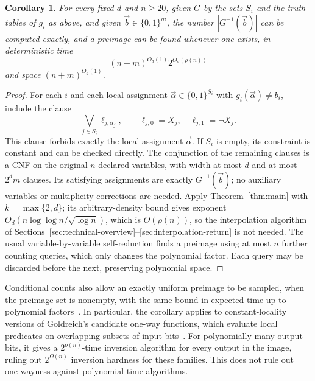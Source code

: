 \documentclass[11pt,reqno]{amsart}
\numberwithin{equation}{section}
\newtheorem{corollary}[theorem]{Corollary}
\theoremstyle{definition}\newtheorem{definition}[theorem]{Definition}
\theoremstyle{remark}\newtheorem{remark}[theorem]{Remark}
\renewcommand{\ge}{\geqslant}
\begin{document}
\begin{corollary}\label{cor:consequence-local-inversion}
For every fixed $d$ and $n\ge20$, given $G$ by the sets $S_i$
and the truth tables of $g_i$ as above, and given
$\vec b\in\{0,1\}^m$, the number $|G^{-1}(\vec b)|$ can be
computed exactly, and a preimage can be
found whenever one exists, in deterministic time
\[
 (n+m)^{O_d(1)}2^{O_d(\rho(n))}
\]
and space $(n+m)^{O_d(1)}$.
\end{corollary}
\begin{proof}
For each $i$ and each local assignment
$\vec{\alpha}\in\{0,1\}^{S_i}$ with $g_i(\vec{\alpha})\ne b_i$,
include the clause
\[
 \bigvee_{j\in S_i}\ell_{j,\alpha_j},
 \qquad
 \ell_{j,0}=X_j,\quad \ell_{j,1}=\neg X_j.
\]
This clause forbids exactly the local assignment $\vec{\alpha}$.
If $S_i$ is empty, its constraint is constant and can be checked
directly. The conjunction of the remaining clauses is a CNF on the
original $n$ declared variables, with width at most $d$ and at most
$2^d m$ clauses. Its satisfying assignments are exactly
$G^{-1}(\vec{b})$; no auxiliary variables or multiplicity corrections
are needed. Apply Theorem~\ref{thm:main} with $k=\max\{2,d\}$;
its arbitrary-density bound gives exponent
$O_d(n\log\log n/\sqrt{\log n})$, which is $O(\rho(n))$, so the
interpolation algorithm of
Sections~\ref{sec:technical-overview}--\ref{sec:interpolation-return}
is not needed.
The usual variable-by-variable self-reduction finds a preimage using
at most $n$ further counting queries, which only changes the
polynomial factor. Each query may be discarded before the next,
preserving polynomial space.
\end{proof}

Conditional counts also allow an exactly uniform preimage to be
sampled, when the preimage set is nonempty, with the same bound in
expected time up to polynomial factors~\cite{JVV86}.
In particular, the corollary applies to constant-locality versions
of Goldreich's candidate one-way functions, which evaluate local
predicates on overlapping subsets of input bits~\cite{Gol00}.
For polynomially many output bits, it gives a $2^{o(n)}$-time
inversion algorithm for every output in the image, ruling out
$2^{\Omega(n)}$ inversion hardness for these families. This does not
rule out one-wayness against polynomial-time algorithms.
\end{document}
